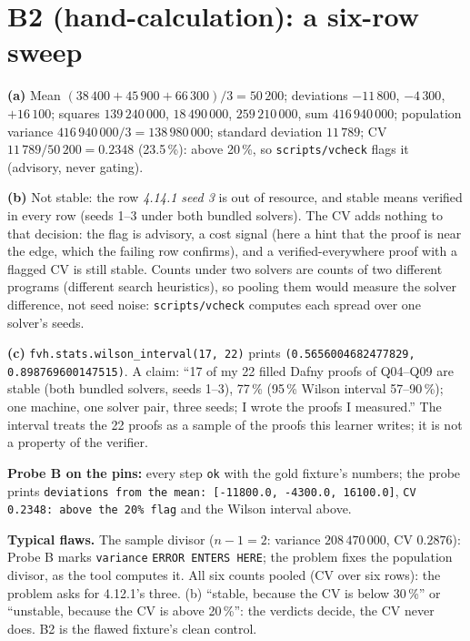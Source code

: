\documentclass[11pt]{article}
\begin{document}
\section*{B2 (hand-calculation): a six-row sweep}

\textbf{(a)} Mean $(38\,400 + 45\,900 + 66\,300)/3 = 50\,200$; deviations
$-11\,800$, $-4\,300$, $+16\,100$; squares $139\,240\,000$, $18\,490\,000$,
$259\,210\,000$, sum $416\,940\,000$; population variance $416\,940\,000/3 =
138\,980\,000$; standard deviation $11\,789$; CV $11\,789/50\,200 = 0.2348$
(23.5\,\%): above 20\,\%, so \texttt{scripts/vcheck} flags it (advisory, never
gating).

\textbf{(b)} Not stable: the row \emph{4.14.1 seed 3} is out of resource, and
stable means verified in every row (seeds 1--3 under both bundled solvers).
The CV adds nothing to that decision: the flag is advisory, a cost signal (here
a hint that the proof is near the edge, which the failing row confirms), and a
verified-everywhere proof with a flagged CV is still stable. Counts under two
solvers are counts of two different programs (different search heuristics), so
pooling them would measure the solver difference, not seed noise:
\texttt{scripts/vcheck} computes each spread over one solver's seeds.

\textbf{(c)} \texttt{fvh.stats.wilson\_interval(17, 22)} prints
\texttt{(0.5656004682477829, 0.898769600147515)}. A claim: ``17 of my 22
filled Dafny proofs of Q04--Q09 are stable (both bundled solvers, seeds 1--3),
77\,\% (95\,\% Wilson interval 57--90\,\%); one machine, one solver pair,
three seeds; I wrote the proofs I measured.'' The interval treats the 22 proofs
as a sample of the proofs this learner writes; it is not a property of the
verifier.

\textbf{Probe B on the pins:} every step \texttt{ok} with the gold fixture's
numbers; the probe prints \texttt{deviations from the mean: [-11800.0,
-4300.0, 16100.0]}, \texttt{CV 0.2348: above the 20\% flag} and the Wilson
interval above.

\textbf{Typical flaws.} The sample divisor ($n - 1 = 2$: variance
$208\,470\,000$, CV $0.2876$): Probe B marks \texttt{variance} \texttt{ERROR ENTERS
HERE}; the problem fixes the population divisor, as the tool computes it. All
six counts pooled (CV over six rows): the problem asks for 4.12.1's three. (b)
``stable, because the CV is below 30\,\%'' or ``unstable, because the CV is
above 20\,\%'': the verdicts decide, the CV never does. B2 is the flawed
fixture's clean control.
\end{document}

